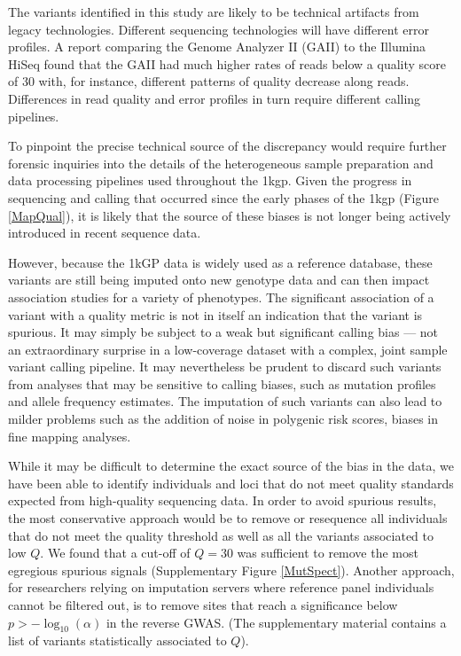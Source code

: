 \documentclass[custompaper]{MBE}%
\begin{document}
The variants identified in this study are likely to be technical artifacts from legacy technologies.
Different sequencing technologies will have different error profiles. 
A report comparing the Genome Analyzer II (GAII) to the Illumina HiSeq found that the GAII had much higher rates of reads below a quality score of 30 \citep{Minoche2011} with, for instance, different patterns of quality decrease along reads. 
Differences in read quality and error profiles in turn require different calling pipelines.
 
To pinpoint the precise technical source of the discrepancy would require further forensic inquiries into the details of the heterogeneous sample preparation and data processing pipelines used throughout the 1kgp. Given the progress in sequencing and calling that occurred since the early phases of the 1kgp (Figure \ref{MapQual}), it is likely that the source of these biases is not longer being actively introduced in recent sequence data.

However, because the 1kGP data is widely used as a reference database, these variants are still being imputed onto new genotype data and can then impact association studies for a variety of phenotypes. The significant association of a variant with a quality metric is not in itself an indication that the variant is spurious. It may simply be subject to a weak but significant calling bias --- not an extraordinary surprise in a low-coverage dataset with a complex, joint sample variant calling pipeline. It may nevertheless be prudent to discard such variants from analyses that may be sensitive to calling biases, such as mutation profiles and allele frequency estimates. The imputation of such variants can also lead to milder problems such as the addition of noise in polygenic risk scores, biases in fine mapping analyses.

While it may be difficult to determine the exact source of the bias in the data, we have been able to identify individuals and loci that do not meet quality standards expected from high-quality sequencing data.
In order to avoid spurious results, the most conservative approach would be to remove or resequence all individuals that do not meet the quality threshold as well as all the variants associated to low $Q$. 
We found that a cut-off of $Q = 30$ was sufficient to remove the most egregious spurious signals (Supplementary Figure \ref{MutSpect}).
Another approach, for researchers relying on imputation servers where reference panel individuals cannot be filtered out, is to remove sites that reach a significance below $ p > -\log_{10}(\alpha)$ in the reverse GWAS. (The supplementary material contains a list of variants statistically associated to $Q$).
\end{document}
